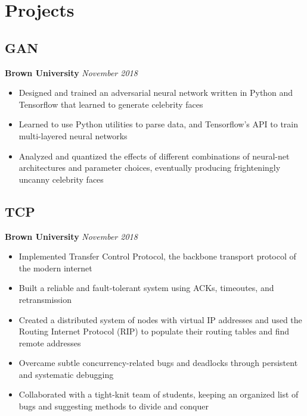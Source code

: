 \documentclass[11pt]{article}
\begin{document}
\section{Projects}

\subsection{GAN} 
\textbf{Brown University} \hfill \textit{November 2018}
\begin{itemize}
	\item Designed and trained an adversarial neural network written in Python and Tensorflow that learned to generate celebrity faces
	\item Learned to use Python utilities to parse data, and Tensorflow's API to train multi-layered neural networks
	\item Analyzed and quantized the effects of different combinations of neural-net architectures and parameter choices, eventually producing frighteningly uncanny celebrity faces
\end{itemize}

\subsection{TCP}
\textbf{Brown University} \hfill \textit{November 2018}
\begin{itemize}
	\item Implemented Transfer Control Protocol, the backbone transport protocol of the modern internet 
	\item Built a reliable and fault-tolerant system using ACKs, timeoutes, and retransmission
	\item Created a distributed system of nodes with virtual IP addresses and used the Routing Internet Protocol (RIP) to populate their routing tables and find remote addresses
	\item Overcame subtle concurrency-related bugs and deadlocks through persistent and systematic debugging 
	\item Collaborated with a tight-knit team of students, keeping an organized list of bugs and suggesting methods to divide and conquer
\end{itemize}

\end{document}
